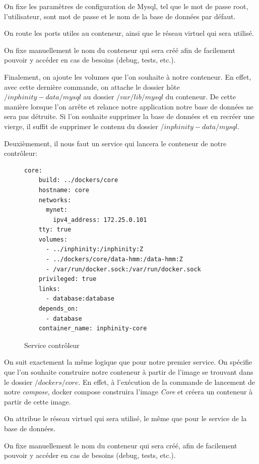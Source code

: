On fixe les paramètres de configuration de Mysql, tel que le mot de passe root, l'utilisateur, sont mot de passe et le nom de la base de données par défaut.

On route les ports utiles au conteneur, ainsi que le réseau virtuel qui sera utilisé.

On fixe manuellement le nom du conteneur qui sera créé afin de facilement pouvoir y accéder en cas de besoins (debug, tests, etc.).

Finalement, on ajoute les volumes que l'on souhaite à notre conteneur. En effet, avec cette dernière commande, on attache le dossier hôte \emph{$/inphinity-data/mysql$} au dossier \emph{$/var/lib/mysql$} du conteneur. De cette manière lorsque l'on arrête et relance notre application notre base de données ne sera pas détruite. Si l'on souhaite supprimer la base de données et en recréer une vierge, il suffit de supprimer le contenu du dossier \emph{$/inphinity-data/mysql$}.

Deuxièmement, il nous faut un service qui lancera le conteneur de notre contrôleur:

\begin{figure}[H] 
\centering 
\begin{lstlisting}[frame=single]
core:
    build: ../dockers/core
    hostname: core
    networks:
      mynet:
        ipv4_address: 172.25.0.101
    tty: true
    volumes:
      - ../inphinity:/inphinity:Z
      - ../dockers/core/data-hmm:/data-hmm:Z
      - /var/run/docker.sock:/var/run/docker.sock
    privileged: true
    links:
      - database:database
    depends_on:
      - database
    container_name: inphinity-core
\end{lstlisting}
\caption[Service contrôleur]{Service contrôleur}
\label{fig:serviceCore} 
\end{figure}

On suit exactement la même logique que pour notre premier service. On spécifie que l'on souhaite construire notre conteneur à partir de l'image se trouvant dans le dossier \emph{$/dockers/core$}. En effet, à l'exécution de la commande de lancement de notre \emph{compose}, docker compose construira l'image \emph{Core} et créera un conteneur à partir de cette image.

On attribue le réseau virtuel qui sera utilisé, le même que pour le service de la base de données.

On fixe manuellement le nom du conteneur qui sera créé, afin de facilement pouvoir y accéder en cas de besoins (debug, tests, etc.).


